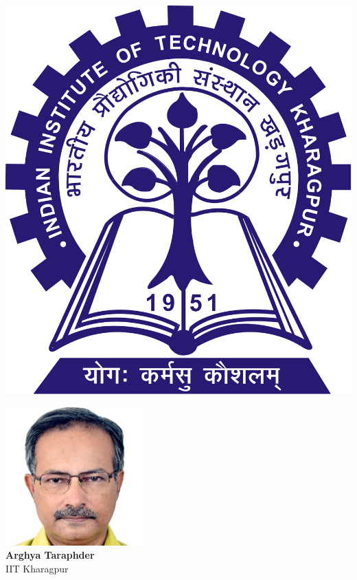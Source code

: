 \documentclass[aspectratio=169]{beamer}
\begin{document}
\begin{frame}{}
\hspace*{\fill}
\begin{minipage}{0.1\textwidth}
	\includegraphics[width=\textwidth]{IITKGP.png}\\
\end{minipage}
\hspace*{\fill}
\begin{minipage}{0.3\textwidth}
	\centering
	\includegraphics[width=0.4\textwidth]{arghya.jpg}\\
	\footnotesize{{\bf Arghya Taraphder}\\
	IIT Kharagpur}
\end{minipage}
\hspace*{\fill}
\begin{minipage}{0.3\textwidth}

\end{minipage}
\end{frame}
\end{document}
